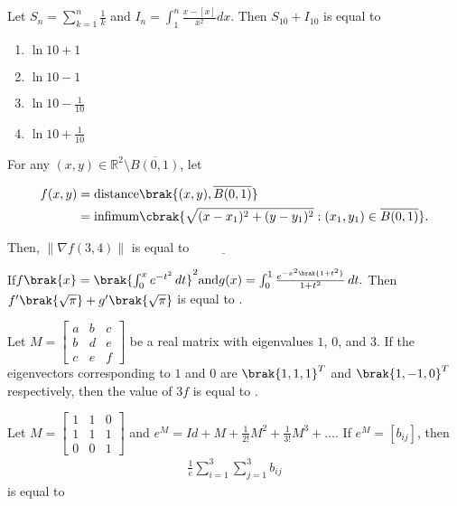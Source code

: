 \item Let $S_{n}=\sum_{k=1}^{n}\frac{1}{k}$ and $I_{n}=\int_{1}^{n}\frac{x-[x]}{x^{2}}dx$. Then $S_{10}+I_{10}$ is equal to
\begin{multicols}{2}
\begin{enumerate}
    \item $\ln 10 + 1$
    \item $\ln 10 - 1$
    \item $\ln 10 - \frac{1}{10}$
    \item $\ln 10 + \frac{1}{10}$
\end{enumerate}
\end{multicols}

\item For any $(x, y) \in \mathbb{R}^2 \setminus \overline{B(0,1)}$, let

\begin{align*}
    f(x, y) &= \text{distance}\brak{(x, y), \overline{B(0,1)}} \\
    &= \text{infimum} \cbrak{\sqrt{(x-x_1)^2 + (y-y_1)^2} : (x_1, y_1) \in \overline{B(0,1)}}.
\end{align*}

Then, $\|\nabla f(3,4)\|$ is equal to $\underline{\hspace{2cm}}$\\

\item If$f\brak{x} = \brak{\int_0^x e^{-t^2} \, dt }^2 \text{and} g(x) = \int_0^1 \frac{e^{-x^2\brak{1 + t^2}}}{1 + t^2} \, dt.$
Then $f'\brak{\sqrt{\pi}} + g'\brak{\sqrt{\pi}}$ is equal to \underline{\hspace{2cm}}.\\

\item Let $M = \begin{bmatrix} a & b & c \\ b & d & e \\ c & e & f \end{bmatrix}$ be a real matrix with eigenvalues $1$, $0$, and $3$. If the eigenvectors corresponding to $1$ and $0$ are $\brak{1, 1, 1}^T$ and $\brak{1, -1, 0}^T$ respectively, then the value of $3f$ is equal to \underline{\hspace{2cm}}.\\

\item Let $M = \begin{bmatrix} 1 & 1 & 0 \\ 1 & 1 & 1 \\ 0 & 0 & 1 \end{bmatrix}$ and $e^M = Id + M + \frac{1}{2!} M^2 + \frac{1}{3!} M^3 + \dots$. If $e^M = [b_{ij}]$, then
\begin{align*}
\frac{1}{e} \sum_{i=1}^3 \sum_{j=1}^3 b_{ij}
\end{align*}
is equal to \underline{\hspace{2cm}}\\

